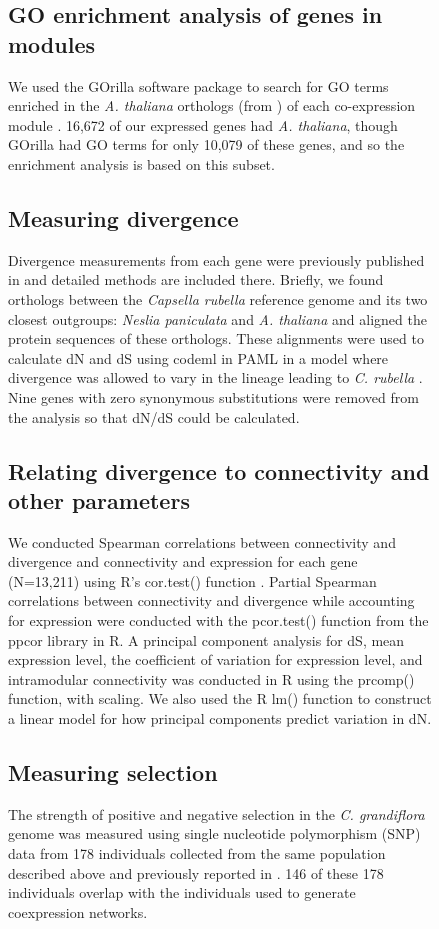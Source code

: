 \begin{figure}[ht!]
\subsection{GO enrichment analysis of genes in modules}
We used the GOrilla software package to search for GO terms enriched in the \textit{A. thaliana} orthologs (from \citep{Williamson2014-tf}) of each co-expression module \citep{Eden2009-hl}. 16,672 of our expressed genes had \textit{A. thaliana}, though GOrilla had GO terms for only 10,079 of these genes, and so the enrichment analysis is based on this subset.

\subsection{Measuring divergence}
Divergence measurements from each gene were previously published in \citep{Williamson2014-tf} and detailed methods are included there. Briefly, we found orthologs between the \textit{Capsella rubella} reference genome and its two closest outgroups: \textit{Neslia paniculata} and \textit{A. thaliana} and aligned the protein sequences of these orthologs. These alignments were used to calculate dN and dS using codeml in PAML in a model where divergence was allowed to vary in the lineage leading to \textit{C. rubella} \citep{Yang2007-rs}. Nine genes with zero synonymous substitutions were removed from the analysis so that dN/dS could be calculated.

\subsection{Relating divergence to connectivity and other parameters}
We conducted Spearman correlations between connectivity and divergence and connectivity and expression for each gene (N=13,211) using R’s cor.test() function \citep{r}. Partial Spearman correlations between connectivity and divergence while accounting for expression were conducted with the pcor.test() function from the ppcor library in R. A principal component analysis for dS, mean expression level, the coefficient of variation for expression level, and intramodular connectivity was conducted in R using the prcomp() function, with scaling. We also used the R lm() function to construct a linear model for how principal components predict variation in dN.

\subsection{Measuring selection}
The strength of positive and negative selection in the \textit{C. grandiflora} genome was measured using single nucleotide polymorphism (SNP) data from 178 individuals collected from the same population described above and previously reported in \citep{Josephs2015-nx,Sicard2015-uc}. 146 of these 178 individuals overlap with the individuals used to generate coexpression networks.


\end{figure}
